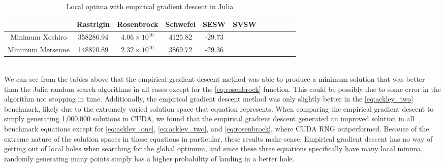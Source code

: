\documentclass{article}
\begin{document}
            \begin{table}[h]
                \begin{centering}
                    \begin{tabular}{|c|c|c|c|c|c|c|c|c|c|c|}
                        \hline
                                        & Rastrigin & Rosenbrock            & Schwefel & SESW   & SVSW \\
                        \hline
                        \hline
                        Minimum Xoshiro & 358286.94 & $4.06 \times 10^{10}$ & 4125.82  & -29.73 &      \\
                        \hline
                        Minimum Mersenne& 148870.89 & $2.32 \times 10^{10}$ & 3869.72  & -29.36 &      \\
                        \hline
                    \end{tabular}
                    \caption{Local optima with empirical gradient descent in Julia}
            \end{centering}
            \end{table}
$ $ \\
We can see from the tables above that the empirical gradient descent method was able to produce a minimum solution that was better than the Julia random search algorithms in all cases except for the \ref{eq:rosenbrock} function. This could be possibly due to some error in the algorithm not stopping in time. Additionally, the empirical gradient descent method was only slightly better in the \ref{eq:ackley_two} benchmark, likely due to the extremely varied solution space that equation represents. When comparing the empirical gradient descent to simply generating 1,000,000 solutions in CUDA, we found that the empirical gradient descent generated an improved solution in all benchmark equations except for \ref{eq:ackley_one}, \ref{eq:ackley_two}, and \ref{eq:rosenbrock}, where CUDA RNG outperformed. Because of the extreme nature of the solution spaces in those equations in particular, these results make sense. Empirical gradient descent has no way of getting out of local holes when searching for the global optimum, and since these three equations specifically have many local minima, randomly generating many points simply has a higher probability of landing in a better hole.
\pagebreak
\end{document}
